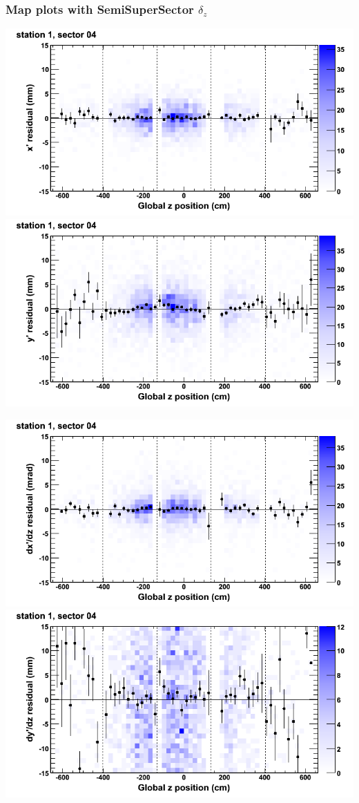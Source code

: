 \documentclass[compress]{beamer}
\begin{document}
\begin{frame}
\frametitle{Map plots with SemiSuperSector $\delta_z$}
\includegraphics[width=0.5\linewidth]{zfit_mapplots/DTvsz_st1sec04_x.png}
\includegraphics[width=0.5\linewidth]{zfit_mapplots/DTvsz_st1sec04_y.png}

\includegraphics[width=0.5\linewidth]{zfit_mapplots/DTvsz_st1sec04_dxdz.png}
\includegraphics[width=0.5\linewidth]{zfit_mapplots/DTvsz_st1sec04_dydz.png}
\end{frame}
\end{document}

